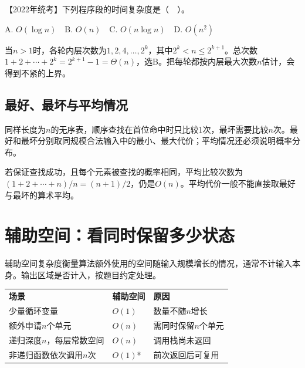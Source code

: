 \hypertarget{ds1-ex2022-stem}{}

【2022年统考】下列程序段的时间复杂度是（　）。


\hypertarget{ds1-code2022}{}

\Needspace{86.4pt}

\hypertarget{ds1-ex2022-options}{}

A. $O(\log n)$　B. $O(n)$　C. $O(n\log n)$　D. $O(n^2)$


\hypertarget{ds1-ex2022-answer}{}

\begin{solution}
当$n>1$时，各轮内层次数为$1,2,4,\ldots,2^k$，其中$2^k<n\le2^{k+1}$。总次数$1+2+\cdots+2^k=2^{k+1}-1=\Theta(n)$，选B。把每轮都按内层最大次数$n$估计，会得到不紧的上界。
\end{solution}

\hypertarget{ds1-cases}{}

\subsection{最好、最坏与平均情况}\label{ds1-cases}

\hypertarget{ds1-cases-text}{}

同样长度为$n$的无序表，顺序查找在首位命中时只比较1次，最坏需要比较$n$次。最好和最坏分别取同规模合法输入中的最小、最大代价；平均情况还必须说明概率分布。


\hypertarget{ds1-average}{}

若保证查找成功，且每个元素被查找的概率相同，平均比较次数为$(1+2+\cdots+n)/n=(n+1)/2$，仍是$O(n)$。平均代价一般不能直接取最好与最坏的算术平均。


\hypertarget{ds1-space}{}

\section{辅助空间：看同时保留多少状态}\label{ds1-space}

\hypertarget{ds1-space-def}{}

\begin{definition}[辅助空间]
辅助空间复杂度衡量算法额外使用的空间随输入规模增长的情况，通常不计输入本身。输出区域是否计入，按题目约定处理。
\end{definition}

\hypertarget{ds1-space-table}{}

\par\smallskip\noindent\begin{tabularx}{\linewidth}{@{}YYY@{}}\toprule
{} \textbf{场景} & \textbf{辅助空间} & \textbf{原因} \\
少量循环变量 & $O(1)$ & 数量不随$n$增长 \\
额外申请$n$个单元 & $O(n)$ & 需同时保留$n$个单元 \\
递归深度$n$，每层常数空间 & $O(n)$ & 调用栈尚未返回 \\
非递归函数依次调用$n$次 & $O(1)$* & 前次返回后可复用 \\\bottomrule\end{tabularx}\par\smallskip

